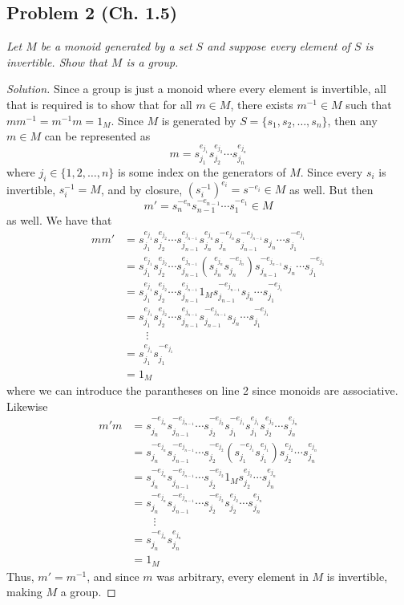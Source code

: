 \documentclass{article}
\begin{document}
\subsection*{Problem 2 (Ch. 1.5)}
{\it Let $M$ be a monoid generated by a set $S$ and suppose every element of $S$ is invertible.
Show that $M$ is a group.}
\begin{proof}[Solution]\let\qed\relax
	Since a group is just a monoid where every element is invertible,
	all that is required is to show that for all $m \in M$,
	there exists $m^{-1} \in M$ such that $mm^{-1} = m^{-1}m = 1_M$.
	Since $M$ is generated by $S = \{s_1, s_2, \dots, s_n\}$,
	then any $m \in M$ can be represented as
	\[
		m = s_{j_1}^{e_{j_1}}s_{j_2}^{e_{j_2}}\cdots s_{j_n}^{e_{j_n}}
	\]
	where $j_i \in \{1,2,\dots,n\}$ is some index on the generators of $M$.
	Since every $s_i$ is invertible, $s_i^{-1} = M$,
	and by closure, $(s_i^{-1})^{e_i} = s^{-e_i} \in M$ as well.
	But then
	\[
		m' = s_n^{-e_n}s_{n-1}^{-e_{n-1}}\cdots s_1^{-e_1}\in M
	\]
	as well.
	We have that
	\begin{align*}
		mm'
		&= s_{j_1}^{e_{j_1}}s_{j_2}^{e_{j_2}}\cdots s_{j_{n-1}}^{e_{j_{n-1}}}s_{j_n}^{e_{j_n}}
		s_{j_n}^{-e_{j_n}}s_{j_{n-1}}^{-e_{j_{n-1}}}s_{j_n}\cdots s_{j_1}^{-e_{j_1}}\\
		&= s_{j_1}^{e_{j_1}}s_{j_2}^{e_{j_2}}\cdots s_{j_{n-1}}^{e_{j_{n-1}}}(s_{j_n}^{e_{j_n}}
		s_{j_n}^{-e_{j_n}})s_{j_{n-1}}^{-e_{j_{n-1}}}s_{j_n}\cdots s_{j_1}^{-e_{j_1}}\\
		&= s_{j_1}^{e_{j_1}}s_{j_2}^{e_{j_2}}\cdots s_{j_{n-1}}^{e_{j_{n-1}}}1_M
		s_{j_{n-1}}^{-e_{j_{n-1}}}s_{j_n}\cdots s_{j_1}^{-e_{j_1}}\\
		&= s_{j_1}^{e_{j_1}}s_{j_2}^{e_{j_2}}\cdots s_{j_{n-1}}^{e_{j_{n-1}}}
		s_{j_{n-1}}^{-e_{j_{n-1}}}s_{j_n}\cdots s_{j_1}^{-e_{j_1}}\\
		& \qquad \vdots\\
		&= s_{j_1}^{e_{j_1}}s_{j_1}^{-e_{j_1}}\\
		&= 1_M
	\end{align*}
	where we can introduce the parantheses on line 2 since monoids are associative.
	Likewise
	\begin{align*}
		m'm
		&= s_{j_n}^{-e_{j_n}}s_{j_{n-1}}^{-e_{j_{n-1}}}\cdots s_{j_2}^{-e_{j_2}}s_{j_1}^{-e_{j_1}}
		s_{j_1}^{e_{j_1}}s_{j_2}^{e_{j_2}}\cdots s_{j_n}^{e_{j_n}}\\
		&= s_{j_n}^{-e_{j_n}}s_{j_{n-1}}^{-e_{j_{n-1}}}\cdots s_{j_2}^{-e_{j_2}}(s_{j_1}^{-e_{j_1}}
		s_{j_1}^{e_{j_1}})s_{j_2}^{e_{j_2}}\cdots s_{j_n}^{e_{j_n}}\\
		&= s_{j_n}^{-e_{j_n}}s_{j_{n-1}}^{-e_{j_{n-1}}}\cdots s_{j_2}^{-e_{j_2}}1_M
		s_{j_2}^{e_{j_2}}\cdots s_{j_n}^{e_{j_n}}\\
		&= s_{j_n}^{-e_{j_n}}s_{j_{n-1}}^{-e_{j_{n-1}}}\cdots s_{j_2}^{-e_{j_2}}
		s_{j_2}^{e_{j_2}}\cdots s_{j_n}^{e_{j_n}}\\
		& \qquad \vdots\\
		&= s_{j_n}^{-e_{j_n}}s_{j_n}^{e_{j_n}}\\
		&= 1_M
	\end{align*}
	Thus, $m' = m^{-1}$,
	and since $m$ was arbitrary, every element in $M$ is invertible,
	making $M$ a group.
\end{proof}
\end{document}
